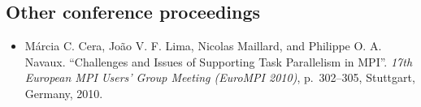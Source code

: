\documentclass[11pt,a4paper]{article}
\begin{document}

\subsection{Other conference proceedings}

\begin{itemize} \itemsep -2pt

\item Márcia C. Cera, João V. F. Lima, Nicolas Maillard, and Philippe O. A. Navaux.
``Challenges and Issues of Supporting Task Parallelism in MPI''.
\emph{17th European MPI Users' Group Meeting (EuroMPI 2010)},
p.~302--305, Stuttgart, Germany, 2010.

\end{itemize}


\end{document}
